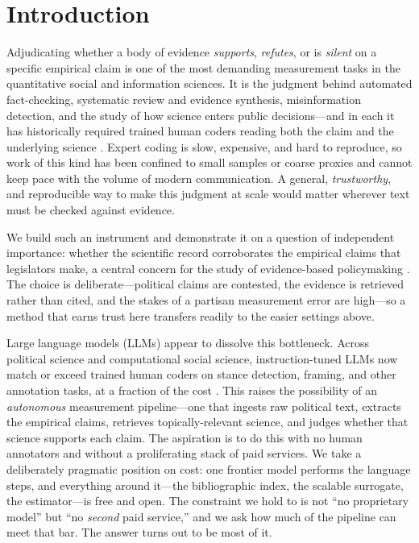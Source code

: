 \section{Introduction}
\label{sec:intro}

Adjudicating whether a body of evidence \emph{supports}, \emph{refutes}, or is \emph{silent} on a specific
empirical claim is one of the most demanding measurement tasks in the quantitative social and information
sciences. It is the judgment behind automated fact-checking, systematic review and evidence synthesis,
misinformation detection, and the study of how science enters public decisions---and in each it has
historically required trained human coders reading both the claim and the underlying science
\citep{grimmer2013text}. Expert coding is slow, expensive, and hard to reproduce, so work of this kind has
been confined to small samples or coarse proxies and cannot keep pace with the volume of modern
communication. A general, \emph{trustworthy}, and reproducible way to make this judgment at scale would
matter wherever text must be checked against evidence.

We build such an instrument and demonstrate it on a question of independent importance: whether the
scientific record corroborates the empirical claims that legislators make, a central concern for the study
of evidence-based policymaking \citep{oliver2022works,bogenschneider2019revisiting,weiss1979many}. The
choice is deliberate---political claims are contested, the evidence is retrieved rather than cited, and the
stakes of a partisan measurement error are high---so a method that earns trust here transfers readily to
the easier settings above.

Large language models (LLMs) appear to dissolve this bottleneck. Across political science and
computational social science, instruction-tuned LLMs now match or exceed trained human coders on stance
detection, framing, and other annotation tasks, at a fraction of the cost
\citep{gilardi2023chatgpt,ziems2024can,heseltine2024llm,tornberg2025llm}. This raises the possibility of
an \emph{autonomous} measurement pipeline---one that ingests raw political text, extracts the empirical
claims, retrieves topically-relevant science, and judges whether that science supports each claim. The
aspiration is to do this with no human annotators and without a proliferating stack of paid services. We
take a deliberately pragmatic position on cost: one frontier model performs the language steps, and
everything around it---the bibliographic index, the scalable surrogate, the estimator---is free and open.
The constraint we hold to is not ``no proprietary model'' but ``no \emph{second} paid service,'' and we
ask how much of the pipeline can meet that bar. The answer turns out to be most of it.

